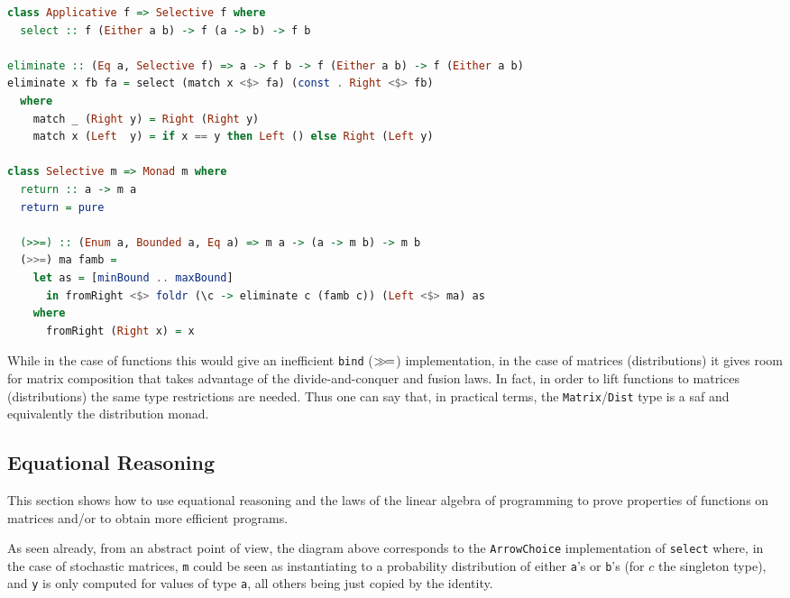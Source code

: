 \documentclass[
  oneside,
  11pt, a4paper,
  footinclude=true,
  headinclude=true,
  cleardoublepage=empty
]{scrbook}
\theoremstyle{definition}
\theoremstyle{definition}
\def\bind{\mathbin{{>\hskip-1ex>\hskip-.4ex=}}}
\begin{document}
        \begin{lstlisting}[language=Haskell, caption={Constrainted monad instance},captionpos=b]
class Applicative f => Selective f where
  select :: f (Either a b) -> f (a -> b) -> f b

eliminate :: (Eq a, Selective f) => a -> f b -> f (Either a b) -> f (Either a b)
eliminate x fb fa = select (match x <$> fa) (const . Right <$> fb)
  where
    match _ (Right y) = Right (Right y)
    match x (Left  y) = if x == y then Left () else Right (Left y)

class Selective m => Monad m where
  return :: a -> m a
  return = pure

  (>>=) :: (Enum a, Bounded a, Eq a) => m a -> (a -> m b) -> m b
  (>>=) ma famb =
    let as = [minBound .. maxBound]
      in fromRight <$> foldr (\c -> eliminate c (famb c)) (Left <$> ma) as
    where
      fromRight (Right x) = x
        \end{lstlisting}{}
        
        While in the case of functions this would give an inefficient \texttt{bind} ($\bind$) implementation, in the case of matrices (distributions) it gives room for matrix composition that takes advantage of the divide-and-conquer and fusion laws. In fact, in order to lift functions to matrices (distributions) the same type restrictions are needed. Thus one can say that, in practical terms, the \texttt{Matrix}/\texttt{Dist} type is a \gls{saf} and equivalently the distribution monad.
        
        \subsection{Equational Reasoning} \label{sec-eq-reason}
        
        This section shows how to use equational reasoning and the laws of the linear algebra of programming to prove properties of functions on matrices and/or to obtain more efficient programs.
        
        \begin{figure}[H]%
        \centering
        \end{figure}
        As seen already, from an abstract point of view, the diagram above corresponds to the \texttt{ArrowChoice} implementation of \texttt{select} where, in the case of stochastic matrices, \texttt{m} could be seen as instantiating to a probability distribution of either \texttt{a}'s or \texttt{b}'s (for $c$ the singleton type), and \texttt{y} is only computed for values of type \texttt{a}, all others being just copied by the identity.
        
\end{document}
